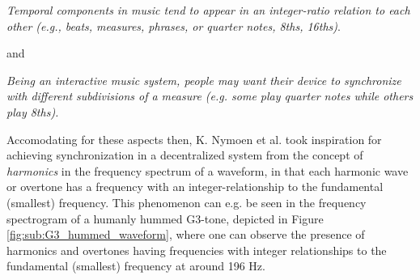 \textit{Temporal components in music tend to appear in an integer-ratio relation to each other (e.g., beats, measures, phrases, or quarter notes, 8ths, 16ths)}. \nl

and \nl

\textit{Being an interactive music system, people may want their device to synchronize with different subdivisions of a measure (e.g. some play quarter notes while others play 8ths).} \nl

Accomodating for these aspects then, K. Nymoen et al. took inspiration for achieving synchronization in a decentralized system from the concept of \textit{harmonics} in the frequency spectrum of a waveform, in that each harmonic wave or overtone has a frequency with an integer-relationship to the fundamental (smallest) frequency. This phenomenon can e.g. be seen in the frequency spectrogram of a humanly hummed G3-tone, depicted in Figure \ref{fig:sub:G3_hummed_waveform}, where one can observe the presence of harmonics and overtones having frequencies with integer relationships to the fundamental (smallest) frequency at around 196 Hz.

